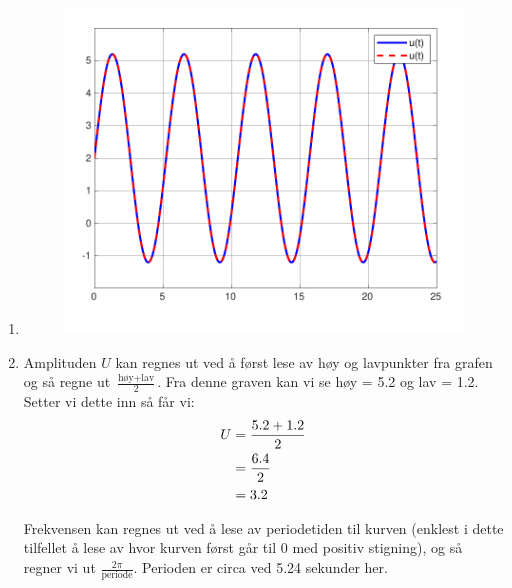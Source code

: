 \documentclass[answers,11pt]{exam}
\begin{document}
\begin{enumerate}[label=\alph*)]
\begin{tcolorbox}
\begin{enumerate}[label=f\arabic*)]
      \item
            \parbox{\textwidth}{
              \begin{figure}[H]
                \centering
                \hspace{0mm}\scalebox{0.75}
                {\includegraphics{figurer/2f2.pdf}}
                \label{fig:2f2}
              \end{figure}
            }
      \item
            Amplituden $U$ kan regnes ut ved å først lese av høy og lavpunkter
            fra grafen og så regne ut $\frac{\text{h{\o}y} + \text{lav}}{2}$.
            Fra denne graven kan vi se høy = 5.2 og lav = 1.2. Setter vi dette
            inn så får vi:
            \begin{align}
              U & = \frac{5.2+1.2}{2} \notag \\
                & =\frac{6.4}{2} \notag      \\
                & =3.2
            \end{align}

            Frekvensen kan regnes ut ved å lese av periodetiden til kurven
            (enklest i dette tilfellet å lese av hvor kurven først går til 0
            med positiv stigning), og så regner vi ut $\frac{2 \pi}{\text{periode}}$.
            Perioden er circa ved 5.24 sekunder her.

    \end{enumerate}


\end{tcolorbox}
\end{enumerate}
\end{document}
